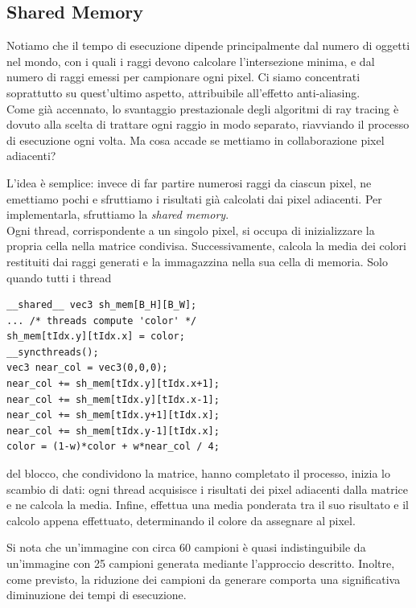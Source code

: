 \documentclass[main.tex]{subfiles}
\begin{document}
\subsection{Shared Memory}

\hspace*{0.25in}Notiamo che il tempo di esecuzione dipende principalmente dal numero di oggetti nel mondo, con i quali i raggi devono calcolare l'intersezione minima, e dal numero di raggi emessi per campionare ogni pixel. Ci siamo concentrati soprattutto su quest'ultimo aspetto, attribuibile all'effetto anti-aliasing. \\
Come già accennato, lo svantaggio prestazionale degli algoritmi di ray tracing è dovuto alla scelta di trattare ogni raggio in modo separato, riavviando il processo di esecuzione ogni volta. Ma cosa accade se mettiamo in collaborazione pixel adiacenti?

L'idea è semplice: invece di far partire numerosi raggi da ciascun pixel, ne emettiamo pochi e sfruttiamo i risultati già calcolati dai pixel adiacenti. Per implementarla, sfruttiamo la \textit{shared memory}. \\
Ogni thread, corrispondente a un singolo pixel, si occupa di inizializzare la propria cella nella matrice condivisa. Successivamente, calcola la media dei colori restituiti dai raggi generati e la immagazzina nella sua cella di memoria. Solo quando tutti i thread 
\begin{minipage}{0.58\textwidth}
\vspace{12pt}
\begin{lstlisting}[style=cppstyle, label=cppexample]
__shared__ vec3	sh_mem[B_H][B_W];
... /* threads compute 'color' */ 
sh_mem[tIdx.y][tIdx.x] = color;
__syncthreads();
vec3 near_col = vec3(0,0,0);
near_col += sh_mem[tIdx.y][tIdx.x+1];
near_col += sh_mem[tIdx.y][tIdx.x-1];
near_col += sh_mem[tIdx.y+1][tIdx.x];
near_col += sh_mem[tIdx.y-1][tIdx.x];
color = (1-w)*color + w*near_col / 4;
\end{lstlisting}
\end{minipage}%
\hspace{10pt}
\begin{minipage}{0.39\textwidth}
   del blocco, che condividono la matrice, hanno completato il processo, inizia lo scambio di dati: ogni thread acquisisce i risultati dei pixel adiacenti dalla matrice e ne calcola la media. Infine, effettua una media ponderata tra il suo risultato e il calcolo appena effettuato, determinando il colore da assegnare al pixel.
\end{minipage} 
Si nota che un'immagine con circa 60 campioni è quasi indistinguibile da un'immagine con 25 campioni generata mediante l'approccio descritto. Inoltre, come previsto, la riduzione dei campioni da generare comporta una significativa diminuzione dei tempi di esecuzione.
\end{document}
